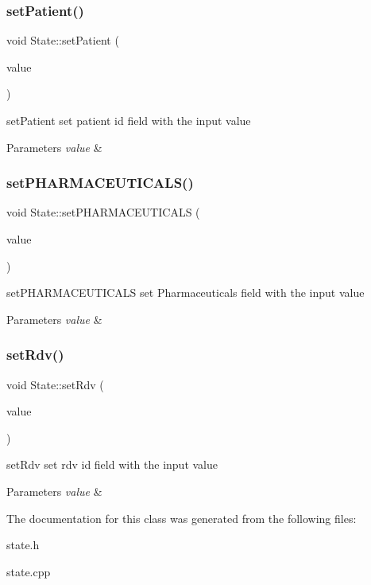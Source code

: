 \subsubsection{\texorpdfstring{setPatient()}{setPatient()}}
{\footnotesize\ttfamily void State\+::set\+Patient (\begin{DoxyParamCaption}\item[{const Q\+String \&}]{value }\end{DoxyParamCaption})}



set\+Patient set patient id field with the input value 


\begin{DoxyParams}{Parameters}
{\em value} & \\
\hline
\end{DoxyParams}
\mbox{\label{class_state_aa494c330e398a6477699b7a3890a6d4f}} 
\subsubsection{\texorpdfstring{setPHARMACEUTICALS()}{setPHARMACEUTICALS()}}
{\footnotesize\ttfamily void State\+::set\+P\+H\+A\+R\+M\+A\+C\+E\+U\+T\+I\+C\+A\+LS (\begin{DoxyParamCaption}\item[{const Q\+String \&}]{value }\end{DoxyParamCaption})}



set\+P\+H\+A\+R\+M\+A\+C\+E\+U\+T\+I\+C\+A\+LS set Pharmaceuticals field with the input value 


\begin{DoxyParams}{Parameters}
{\em value} & \\
\hline
\end{DoxyParams}
\mbox{\label{class_state_a20029d32d294b2dcda3569ce5e512433}} 
\subsubsection{\texorpdfstring{setRdv()}{setRdv()}}
{\footnotesize\ttfamily void State\+::set\+Rdv (\begin{DoxyParamCaption}\item[{const Q\+String \&}]{value }\end{DoxyParamCaption})}



set\+Rdv set rdv id field with the input value 


\begin{DoxyParams}{Parameters}
{\em value} & \\
\hline
\end{DoxyParams}


The documentation for this class was generated from the following files\+:\begin{DoxyCompactItemize}
\item 
state.\+h\item 
state.\+cpp\end{DoxyCompactItemize}
